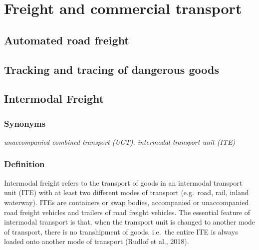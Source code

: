 \documentclass[
]{book}
\begin{document}
\hypertarget{freight}{%
\chapter{Freight and commercial transport}\label{freight}}

\hypertarget{automated_road_freight}{%
\section{Automated road freight}\label{automated_road_freight}}

\hypertarget{dangerous_goods}{%
\section{Tracking and tracing of dangerous goods}\label{dangerous_goods}}

\hypertarget{intermodal_freight}{%
\section{Intermodal Freight}\label{intermodal_freight}}

\hypertarget{synonyms-19}{%
\subsection*{Synonyms}\label{synonyms-19}}

\emph{unaccompanied combined transport (UCT), intermodal transport unit (ITE)}

\hypertarget{definition-22}{%
\subsection*{Definition}\label{definition-22}}

Intermodal freight refers to the transport of goods in an intermodal transport unit (ITE) with at least two different modes of transport (e.g.~road, rail, inland waterway). ITEs are containers or swap bodies, accompanied or unaccompanied road freight vehicles and trailers of road freight vehicles. The essential feature of intermodal transport is that, when the transport unit is changed to another mode of transport, there is no transhipment of goods, i.e.~the entire ITE is always loaded onto another mode of transport (Rudlof et al., 2018).
\end{document}
